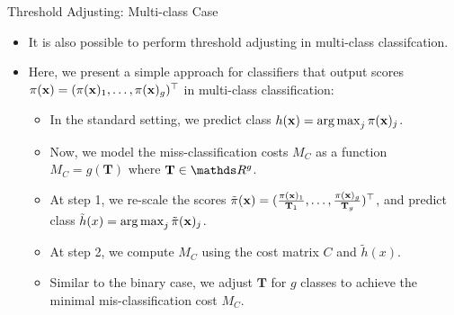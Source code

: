 \documentclass[11pt,compress,t,notes=noshow, xcolor=table]{beamer}
\begin{document}
\begin{vbframe}{Threshold Adjusting: Multi-class Case}
    \footnotesize
    \begin{itemize}
        \footnotesize
        \item It is also possible to perform threshold adjusting in multi-class classifcation.
        
        \item Here, we present a simple approach for classifiers that output scores $\pi(\mathbf{x}) = (\pi(\mathbf{x})_1,\ldots,\pi(\mathbf{x})_g)^\top$ in multi-class classification:
        
        \begin{itemize}
            \footnotesize
            \item In the standard setting, we predict class $h(\mathbf{x}) = \operatorname{arg\,max}_{j} \pi(\mathbf{x})_j$.
            \vspace{10pt}
            
            \item Now, we model the miss-classification costs $M_C$ as a function $M_C = g(\mathbf{T})$ where $\mathbf{T} \in \R^{g}$.
            \vspace{10pt}
            
            \item At step 1, we re-scale the scores $\tilde{\pi}(\mathbf{x}) = (\frac{\pi(\mathbf{x})_1}{\mathbf{T}_1},\ldots, \frac{\pi(\mathbf{x})_g}{ \mathbf{T}_g})^\top$, and predict class $\tilde{h}(x) = \operatorname{arg\,max}_j \tilde{\pi}(\mathbf{x})_j$.
            \vspace{10pt}

            \item At step 2, we compute $M_C$ using the cost matrix $C$ and $\tilde{h}(x)$.
            \vspace{10pt}

            \item Similar to the binary case, we adjust $\mathbf{T}$ for $g$ classes to achieve the minimal mis-classification cost $M_C$.
            \vspace{10pt}

        \end{itemize}
    \end{itemize}
\end{vbframe}
\end{document}
